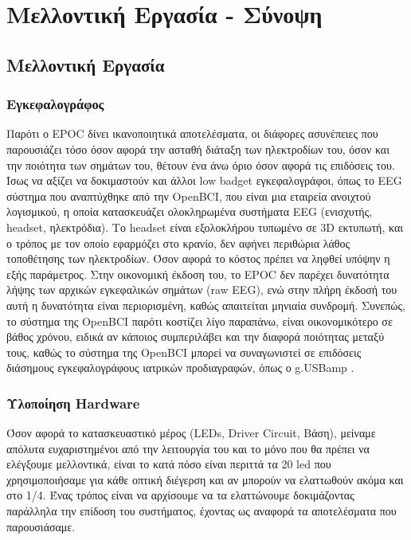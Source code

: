 \documentclass[11pt,a4paper,english,greek,twoside]{../Thesis}
\begin{document}
\chapter{Μελλοντική Εργασία - Σύνοψη} \label{chap:last}

\section{Μελλοντική Εργασία}

\subsection{Εγκεφαλογράφος}
Παρότι ο EPOC δίνει ικανοποιητικά αποτελέσματα, οι διάφορες ασυνέπειες που παρουσιάζει τόσο όσον αφορά την ασταθή διάταξη των ηλεκτροδίων του, όσον και την ποιότητα των σημάτων του, θέτουν ένα άνω όριο όσον αφορά τις επιδόσεις του. Ίσως να αξίζει να δοκιμαστούν και άλλοι low badget εγκεφαλογράφοι, όπως το EEG σύστημα που αναπτύχθηκε από την OpenBCI, που είναι μια εταιρεία ανοιχτού λογισμικού, η οποία κατασκευάζει ολοκληρωμένα συστήματα EEG (ενισχυτής, headset, ηλεκτρόδια). Το headset είναι εξολοκλήρου τυπωμένο σε 3D εκτυπωτή, και ο τρόπος με τον οποίο εφαρμόζει στο κρανίο, δεν αφήνει περιθώρια λάθος τοποθέτησης των ηλεκτροδίων. Όσον αφορά το κόστος πρέπει να ληφθεί υπόψην η εξής παράμετρος. Στην οικονομική έκδοση του, το EPOC δεν παρέχει δυνατότητα λήψης των αρχικών εγκεφαλικών σημάτων (raw EEG), ενώ στην πλήρη έκδοσή του αυτή η δυνατότητα είναι περιορισμένη, καθώς απαιτείται μηνιαία συνδρομή. Συνεπώς, το σύστημα της OpenBCI παρότι κοστίζει λίγο παραπάνω, είναι οικονομικότερο σε βάθος χρόνου, ειδικά αν κάποιος συμπεριλάβει και την διαφορά ποιότητας μεταξύ τους, καθώς το σύστημα της OpenBCI μπορεί να συναγωνιστεί σε επιδόσεις διάσημους εγκεφαλογράφους ιατρικών προδιαγραφών, όπως ο g.USBamp \cite{Frey2016-fx}.

\subsection{Υλοποίηση Hardware}
Όσον αφορά το κατασκευαστικό μέρος (LEDs, Driver Circuit, Βάση), μείναμε απόλυτα ευχαριστημένοι από την λειτουργία του και το μόνο που θα πρέπει να ελέγξουμε μελλοντικά, είναι το κατά πόσο είναι περιττά τα 20 led που χρησιμοποιήσαμε για κάθε οπτική διέγερση και αν μπορούν να ελαττωθούν ακόμα και στο 1/4. Ένας τρόπος είναι να αρχίσουμε να τα ελαττώνουμε δοκιμάζοντας παράλληλα την επίδοση του συστήματος, έχοντας ως αναφορά τα αποτελέσματα που παρουσιάσαμε.
\end{document}
